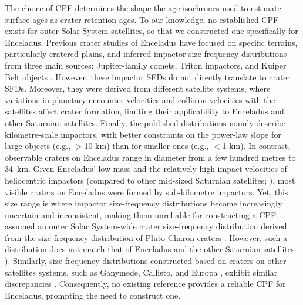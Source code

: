 \documentclass[preprint,12pt,3p,times,authoryear]{elsarticle}
\begin{document}
The choice of CPF determines the shape the age-isochrones used to estimate surface ages as crater retention ages. To our knowledge, no established CPF exists for outer Solar System satellites, so that we constructed one specifically for Enceladus. Previous crater studies of Enceladus have focused on specific terrains, particularly cratered plains, and inferred impactor size-frequency distributions from three main sources: Jupiter-family comets, Triton impactors, and Kuiper Belt objects \citep{Zahnle2003, Singer2019, Bottke2024}.
However, these impactor SFDs do not directly translate to crater SFDs.
Moreover, they were derived from different satellite systems, where variations in planetary encounter velocities and collision velocities with the satellites affect crater formation, limiting their applicability to Enceladus and other Saturnian satellites.
Finally, the published distributions mainly describe kilometre-scale impactors, with better constraints on the power-law slope for large objects (e.g., $>$10 km) than for smaller ones (e.g., $<$1 km).
In contrast, observable craters on Enceladus range in diameter from a few hundred metres to 34~km. Given Enceladus’ low mass and the relatively high impact velocities of heliocentric impactors (compared to other mid-sized Saturnian satellites; \citealt{Zahnle2003, Wong2021}), most visible craters on Enceladus were formed by sub-kilometre impactors. Yet, this size range is where impactor size-frequency distributions become increasingly uncertain and inconsistent, making them unreliable for constructing a CPF. \\

\citet{Wong2023} assumed an outer Solar System-wide crater size-frequency distribution derived from the size-frequency distribution of Pluto-Charon craters \citep{Singer2019}. However, such a distribution does not match that of Enceladus and the other Saturnian satellites \citep{Kirchoff2022}). Similarly, size-frequency distributions constructed based on craters on other satellites systems, such as Ganymede, Callisto, and Europa \citep{Zahnle2003}, exhibit similar discrepancies \citep{Wong2023}.
Consequently, no existing reference provides a reliable CPF for Enceladus, prompting the need to construct one.\\

\end{document}
